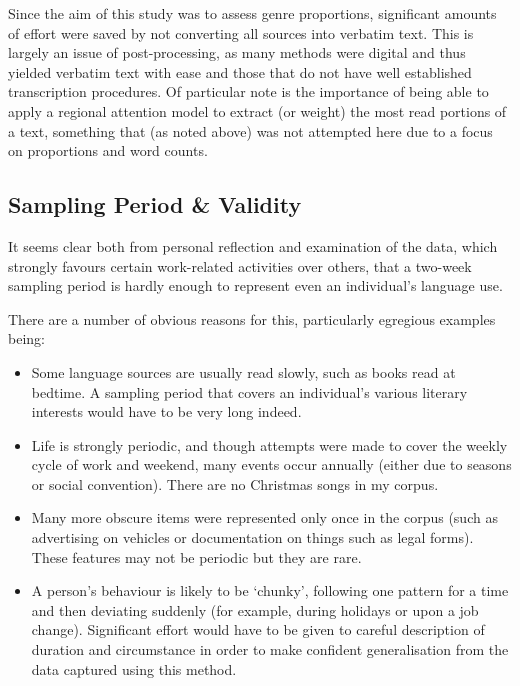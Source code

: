 


Since the aim of this study was to assess genre proportions, significant amounts of effort were saved by not converting all sources into verbatim text.  This is largely an issue of post-processing, as many methods were digital and thus yielded verbatim text with ease and those that do not have well established transcription procedures.  Of particular note is the importance of being able to apply a regional attention model to extract (or weight) the most read portions of a text, something that (as noted above) was not attempted here due to a focus on proportions and word counts.






\subsection{Sampling Period \& Validity}
It seems clear both from personal reflection and examination of the data, which strongly favours certain work-related activities over others, that a two-week sampling period is hardly enough to represent even an individual's language use.

There are a number of obvious reasons for this, particularly egregious examples being:

\begin{itemize}
    \item Some language sources are usually read slowly, such as books read at bedtime.  A sampling period that covers an individual's various literary interests would have to be very long indeed.
    \item Life is strongly periodic, and though attempts were made to cover the weekly cycle of work and weekend, many events occur annually (either due to seasons or social convention).  There are no Christmas songs in my corpus.
    \item Many more obscure items were represented only once in the corpus (such as advertising on vehicles or documentation on things such as legal forms).  These features may not be periodic but they are rare.
    \item A person's behaviour is likely to be `chunky', following one pattern for a time and then deviating suddenly (for example, during holidays or upon a job change).  Significant effort would have to be given to careful description of duration and circumstance in order to make confident generalisation from the data captured using this method.
\end{itemize}

